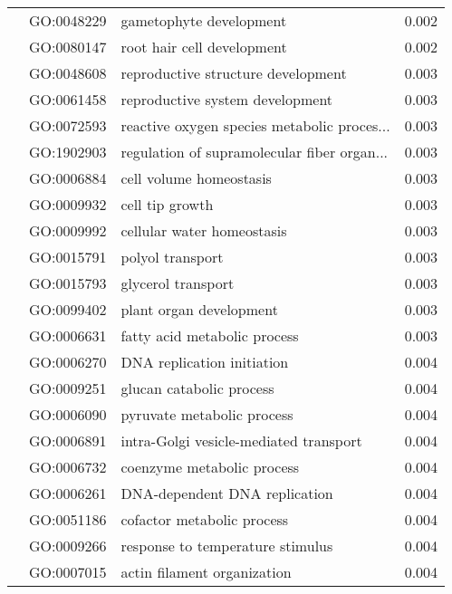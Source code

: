 \begin{longtable}{lllr}
   & GO:0048229 &                      gametophyte development &         0.002 \\
   & GO:0080147 &                   root hair cell development &         0.002 \\
   & GO:0048608 &           reproductive structure development &         0.003 \\
   & GO:0061458 &              reproductive system development &         0.003 \\
   & GO:0072593 &  reactive oxygen species metabolic proces... &         0.003 \\
   & GO:1902903 &  regulation of supramolecular fiber organ... &         0.003 \\
   & GO:0006884 &                      cell volume homeostasis &         0.003 \\
   & GO:0009932 &                              cell tip growth &         0.003 \\
   & GO:0009992 &                   cellular water homeostasis &         0.003 \\
   & GO:0015791 &                             polyol transport &         0.003 \\
   & GO:0015793 &                           glycerol transport &         0.003 \\
   & GO:0099402 &                      plant organ development &         0.003 \\
   & GO:0006631 &                 fatty acid metabolic process &         0.003 \\
   & GO:0006270 &                   DNA replication initiation &         0.004 \\
   & GO:0009251 &                     glucan catabolic process &         0.004 \\
   & GO:0006090 &                   pyruvate metabolic process &         0.004 \\
   & GO:0006891 &       intra-Golgi vesicle-mediated transport &         0.004 \\
   & GO:0006732 &                   coenzyme metabolic process &         0.004 \\
   & GO:0006261 &                DNA-dependent DNA replication &         0.004 \\
   & GO:0051186 &                   cofactor metabolic process &         0.004 \\
   & GO:0009266 &             response to temperature stimulus &         0.004 \\
   & GO:0007015 &                  actin filament organization &         0.004 \\

\end{longtable}

